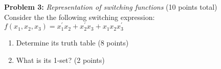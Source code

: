 \newpage

\noindent \textbf{Problem 3:} \emph{Representation of switching functions} (10 points total)\\

Consider the the following switching expression: $f(x_1,x_2,x_3)=x_{1}^{'}x_{2} + x_{2}^{'}x_{3} + x_{1}x_{2}x_{3}^{'} $

\begin{enumerate}

\item Determine its truth table (8 points) %

\noindent{}

\item What is its 1-set? (2 points) %

\noindent{}


\end{enumerate}

